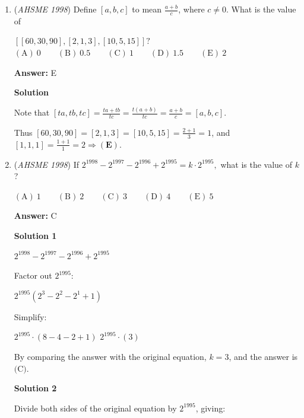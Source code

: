 \begin{enumerate}
 $10 + a - 1 - 8 = 7$
$1 + a = 7$
$a = 6$

 Finally, since $1$ was borrowed from the hundreds column, we have $7 - 1 - 4 = c$, giving $c = 2$.

 As a check, the problem is $762 - 489 = 273$, which is a true sentence.

 The desired quantity is $a + b + c = 6 + 9 + 2 = 17$, and the answer is $\boxed{D}$.

 


	\item (\textit{AHSME 1998}) Define $[a,b,c]$ to mean $\frac {a+b}c$, where $c \neq 0$. What is the value of 


 $\left[[60,30,90],[2,1,3],[10,5,15]\right]?$
$\mathrm{(A) \ }0 \qquad \mathrm{(B) \ }0.5 \qquad \mathrm{(C) \ }1 \qquad \mathrm{(D) \ }1.5 \qquad \mathrm{(E) \ }2$

 \textbf{Answer: }E



\textbf{Solution}

Note that $[ta,tb,tc] = \frac{ta+tb}{tc} = \frac{t(a+b)}{tc} = \frac{a+b}{c} = [a,b,c]$. 

 Thus $[60,30,90] = [2,1,3] = [10,5,15] = \frac{2+1}{3} = 1$, and $[1,1,1] = \frac{1+1}{1} = 2 \Longrightarrow \mathbf{(E)}$.

 


	\item (\textit{AHSME 1998}) If $2^{1998}-2^{1997}-2^{1996}+2^{1995} = k \cdot 2^{1995},$ what is the value of $k$?


 $\mathrm{(A) \ } 1 \qquad \mathrm{(B) \ } 2 \qquad \mathrm{(C) \ } 3 \qquad \mathrm{(D) \ } 4 \qquad \mathrm{(E) \ } 5$

 \textbf{Answer: }C



\textbf{Solution 1}

$2^{1998} - 2^{1997} - 2^{1996} + 2^{1995}$

 Factor out $2^{1995}$:

 $2^{1995}(2^{3} - 2^{2} - 2^{1} + 1)$

 Simplify:

 $2^{1995}\cdot (8 - 4 - 2 + 1)$
$2^{1995}\cdot (3)$

 By comparing the answer with the original equation, $k=3$, and the answer is $\text{(C)}.$




\textbf{Solution 2}

Divide both sides of the original equation by $2^{1995}$, giving:


\end{enumerate}
